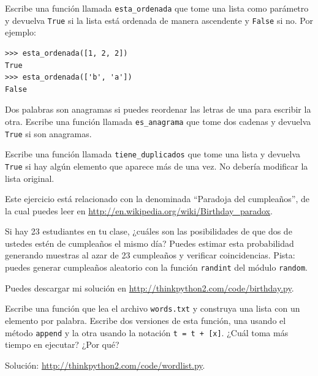 \documentclass[10pt]{book}
\begin{document}
\begin{exercise}
Escribe una función llamada \verb"esta_ordenada" que tome una lista como
parámetro y devuelva {\tt True} si la lista está ordenada de manera
ascendente y {\tt False} si no.  Por ejemplo:

\begin{verbatim}
>>> esta_ordenada([1, 2, 2])
True
>>> esta_ordenada(['b', 'a'])
False
\end{verbatim}

\end{exercise}


\begin{exercise}
\label{anagram}

Dos palabras son anagramas si puedes reordenar las letras de una
para escribir la otra.  Escribe una función llamada \verb"es_anagrama"
que tome dos cadenas y devuelva {\tt True} si son anagramas.
\end{exercise}



\begin{exercise}
\label{duplicate}

Escribe una función llamada \verb"tiene_duplicados" que tome
una lista y devuelva {\tt True} si hay algún elemento que
aparece más de una vez.  No debería modificar la lista
original.

\end{exercise}


\begin{exercise}

Este ejercicio está relacionado con la denominada ``Paradoja del cumpleaños'', de la cual
puedes leer en \url{http://en.wikipedia.org/wiki/Birthday_paradox}.

Si hay 23 estudiantes en tu clase, ¿cuáles son las posibilidades
de que dos de ustedes estén de cumpleaños el mismo día?  Puedes estimar esta
probabilidad generando muestras al azar de 23 cumpleaños
y verificar coincidencias.  Pista: puedes generar cumpleaños aleatorio
con la función {\tt randint} del módulo {\tt random}.

Puedes descargar mi
solución en \url{http://thinkpython2.com/code/birthday.py}.

\end{exercise}



\begin{exercise}

Escribe una función que lea el archivo {\tt words.txt} y construya
una lista con un elemento por palabra.  Escribe dos versiones de
esta función, una usando el método {\tt append} y la
otra usando la notación {\tt t = t + [x]}.  ¿Cuál toma más
tiempo en ejecutar?  ¿Por qué?

Solución: \url{http://thinkpython2.com/code/wordlist.py}.

\end{exercise}
\end{document}
